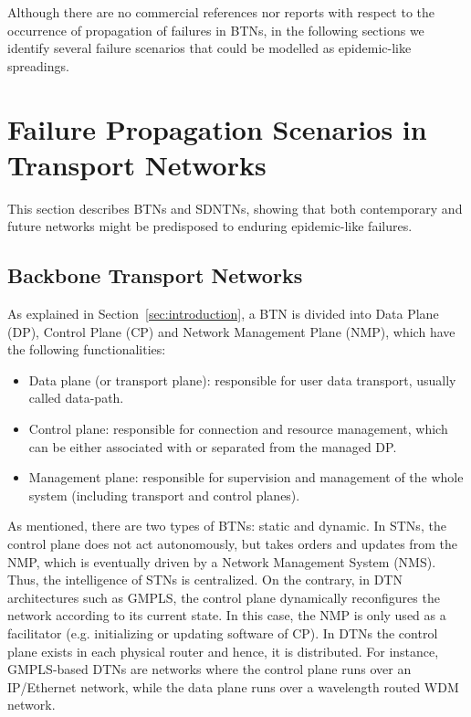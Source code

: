 \documentclass[10pt,draftclsnofoot,onecolumn,journal]{IEEEtran}
\begin{document}
Although there are no commercial references nor reports with respect to the occurrence of propagation of failures in BTNs, in the following sections we identify several failure scenarios that could be modelled as epidemic-like spreadings.



\section{Failure Propagation Scenarios in Transport Networks\label{vulnerability}}
This section describes BTNs and SDNTNs, showing that both contemporary and future networks might be predisposed to enduring epidemic-like failures.

\subsection{Backbone Transport Networks}

As explained in Section~\ref{sec:introduction}, a BTN is divided into Data Plane (DP), Control Plane (CP) and Network Management Plane (NMP), which have the following functionalities:
\begin{itemize}
	\item Data plane (or transport plane): responsible for user data transport, usually called data-path.
	\item Control plane: responsible for connection and resource management, which can be either associated with or separated from the managed DP.
	\item Management plane: responsible for supervision and management of the whole system (including transport and control planes).
\end{itemize}

As mentioned, there are two types of BTNs: static and dynamic. In STNs, the control plane does not act autonomously, but takes orders and updates from the NMP, which is eventually driven by a Network Management System (NMS). Thus, the intelligence of STNs is centralized. On the contrary, in DTN architectures such as GMPLS, the control plane dynamically reconfigures the network according to its current state. In this case, the NMP is only used as a facilitator (e.g. initializing or updating software of CP). In DTNs the control plane exists in each physical router and hence, it is distributed. For instance, GMPLS-based DTNs are networks where the control plane runs over an IP/Ethernet network, while the data plane runs over a wavelength routed WDM network.
\end{document}

